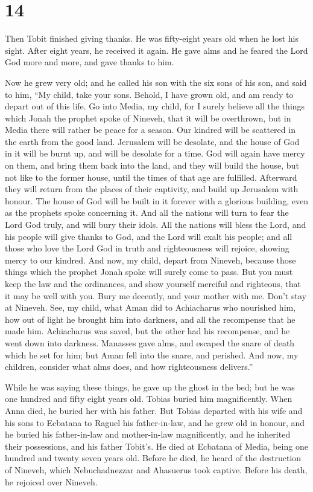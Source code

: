 \hypertarget{section-13}{%
\section{14}\label{section-13}}

 Then Tobit finished giving thanks.  He was
fifty-eight years old when he lost his sight. After eight years, he
received it again. He gave alms and he feared the Lord God more and
more, and gave thanks to him.

 Now he grew very old; and he called his son with the six
sons of his son, and said to him, ``My child, take your sons. Behold, I
have grown old, and am ready to depart out of this life.  Go
into Media, my child, for I surely believe all the things which Jonah
the prophet spoke of Nineveh, that it will be overthrown, but in Media
there will rather be peace for a season. Our kindred will be scattered
in the earth from the good land. Jerusalem will be desolate, and the
house of God in it will be burnt up, and will be desolate for a time.
 God will again have mercy on them, and bring them back into
the land, and they will build the house, but not like to the former
house, until the times of that age are fulfilled. Afterward they will
return from the places of their captivity, and build up Jerusalem with
honour. The house of God will be built in it forever with a glorious
building, even as the prophets spoke concerning it.  And all
the nations will turn to fear the Lord God truly, and will bury their
idols.  All the nations will bless the Lord, and his people
will give thanks to God, and the Lord will exalt his people; and all
those who love the Lord God in truth and righteousness will rejoice,
showing mercy to our kindred.  And now, my child, depart
from Nineveh, because those things which the prophet Jonah spoke will
surely come to pass.  But you must keep the law and the
ordinances, and show yourself merciful and righteous, that it may be
well with you.  Bury me decently, and your mother with me.
Don't stay at Nineveh. See, my child, what Aman did to Achiacharus who
nourished him, how out of light he brought him into darkness, and all
the recompense that he made him. Achiacharus was saved, but the other
had his recompense, and he went down into darkness. Manasses gave alms,
and escaped the snare of death which he set for him; but Aman fell into
the snare, and perished.  And now, my children, consider
what alms does, and how righteousness delivers.''

While he was saying these things, he gave up the ghost in the bed; but
he was one hundred and fifty eight years old. Tobias buried him
magnificently.  When Anna died, he buried her with his
father. But Tobias departed with his wife and his sons to Ecbatana to
Raguel his father-in-law,  and he grew old in honour, and
he buried his father-in-law and mother-in-law magnificently, and he
inherited their possessions, and his father Tobit's.  He
died at Ecbatana of Media, being one hundred and twenty seven years old.
 Before he died, he heard of the destruction of Nineveh,
which Nebuchadnezzar and Ahasuerus took captive. Before his death, he
rejoiced over Nineveh.
